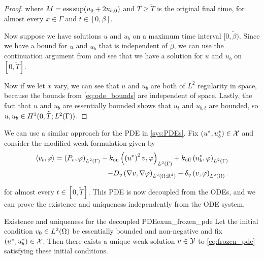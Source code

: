\begin{proof}
    \noindent
    where $M = \operatorname*{ess\,sup}(u_0 + 2 u_{b, 0})$ and $T \geq \widetilde{T}$ is the original final time, for almost every $x \in \Gamma$ and $t \in [0, \beta]$.

    Now suppose we have solutions $u$ and $u_b$ on a maximum time interval $[0, \widetilde{\beta})$. Since we have a bound for $u$ and $u_b$ that is independent of $\widetilde{\beta}$, we can use the continuation argument from \cite{coddington_theory_1984} and see that we have a solution for $u$ and $u_b$ on $[0, \widetilde{T}]$.

    Now if we let $x$ vary, we can see that $u$ and $u_b$ are both of $L^2$ regularity in space, because the bounds from \cref{eq:ode_bounds} are independent of space. Lastly, the fact that $u$ and $u_b$ are essentially bounded shows that $u_t$ and $u_{b, t}$ are bounded, so $u, u_b \in H^1(0, \widetilde{T}; L^2(\Gamma))$.
\end{proof}

\endgroup

We can use a similar approach for the PDE in \cref{sys:PDEs}. Fix $(u^*, u_b^*) \in \mathcal{X}$ and consider the modified weak formulation given by
%
\begin{equation}\label{eq:frozen_pde}
\begin{split}
    \left\langle v_t, \varphi \right\rangle = \left( P_v, \varphi \right)_{L^2(\Gamma)} - k_\text{on} \left( \left(u^*\right)^2 v, \varphi \right)_{L^2(\Gamma)} + k_\text{off} \left( u_b^*, \varphi \right)_{L^2(\Gamma)} \\
    - D_v \left( \nabla v, \nabla \varphi \right)_{L^2(\Omega; \mathbb{R}^d)} - \delta_v \left( v, \varphi \right)_{L^2(\Omega)}.
\end{split}
\end{equation}

\noindent
for almost every $t \in [0, \widetilde{T}]$. This PDE is now decoupled from the ODEs, and we can prove the existence and uniqueness independently from the ODE system.

\begin{lemma}{Existence and uniqueness for the decoupled PDE}{exun_frozen_pde}
    Let the initial condition $v_0 \in L^2(\Omega)$ be essentially bounded and non-negative and fix $(u^*, u_b^*) \in \mathcal{X}$. Then there exists a unique weak solution $v \in \mathcal{Y}$ to \cref{eq:frozen_pde} satisfying these initial conditions.
\end{lemma}

